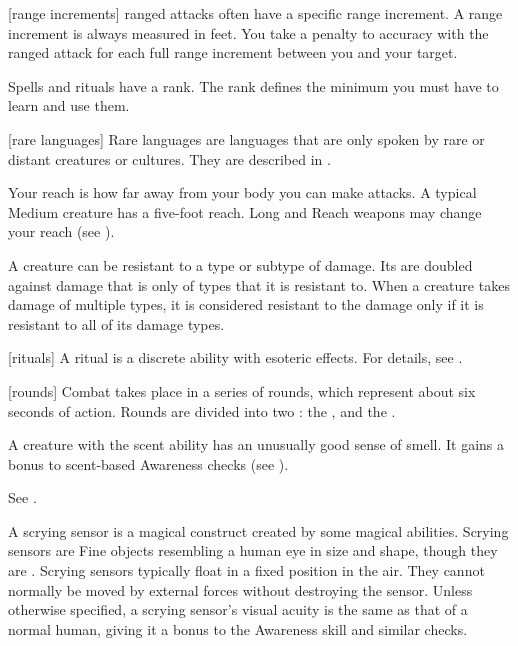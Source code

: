 [range increments]  ranged attacks often have a specific range increment.
A range increment is always measured in feet.
You take a  penalty to accuracy with the ranged attack for each full range increment between you and your target.

 Spells and rituals have a rank.
The rank defines the minimum  you must have to learn and use them.

[rare languages] Rare languages are languages that are only spoken by rare or distant creatures or cultures.
They are described in .

 Your reach is how far away from your body you can make  attacks.
A typical Medium creature has a five-foot reach.
Long and Reach weapons may change your reach (see ).

 A creature can be resistant to a type or subtype of damage.
Its  are doubled against damage that is only of types that it is resistant to.
When a creature takes damage of multiple types, it is considered resistant to the damage only if it is resistant to all of its damage types.

[rituals] A ritual is a discrete  ability with esoteric effects.
For details, see .

[rounds] Combat takes place in a series of rounds, which represent about six seconds of action.
Rounds are divided into two : the , and the .

 A creature with the scent ability has an unusually good sense of smell.
It gains a  bonus to scent-based Awareness checks (see ).

 See .

 A scrying sensor is a magical construct created by some magical abilities.
Scrying sensors are Fine objects resembling a human eye in size and shape, though they are .
Scrying sensors typically float in a fixed position in the air.
They cannot normally be moved by external forces without destroying the sensor.
Unless otherwise specified, a scrying sensor's visual acuity is the same as that of a normal human, giving it a  bonus to the Awareness skill and similar checks.

